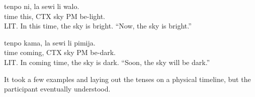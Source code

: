 \documentclass[a4paper,10pt]{article}
\begin{document}
\begin{exe}
 \ex
 \gll tenpo ni, la sewi li walo. \\
 time this, CTX sky PM be-light.\\
 \glt LIT. In this time, the sky is bright.
 \glt ``Now, the sky is bright.''
\end{exe}

\begin{exe}
 \ex
 \gll tenpo kama, la sewi li pimija. \\
 time coming, CTX sky PM be-dark.\\
 \glt LIT. In coming time, the sky is dark.
 \glt ``Soon, the sky will be dark.''
\end{exe}

It took a few examples and laying out the tenses on a
physical timeline, but the participant eventually
understood.
\end{document}
